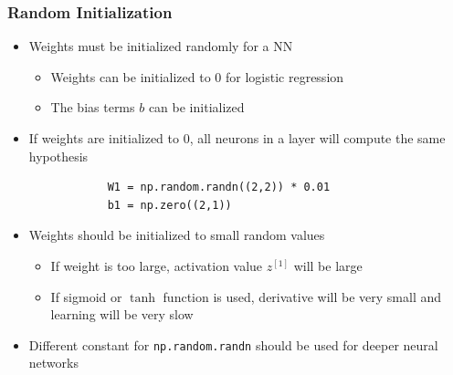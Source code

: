 \documentclass[12pt, letterpaper]{article}
\begin{document}
    \subsubsection{Random Initialization}
    \begin{itemize}
        \item Weights must be initialized randomly for a NN
        \begin{itemize}
            \item Weights can be initialized to 0 for logistic regression
            \item The bias terms $b$ can be initialized
        \end{itemize}
        \item If weights are initialized to 0, all neurons in a layer will compute the same hypothesis
        \begin{verbatim}
            W1 = np.random.randn((2,2)) * 0.01
            b1 = np.zero((2,1))  
        \end{verbatim}
        \item Weights should be initialized to small random values
        \begin{itemize}
            \item If weight is too large, activation value $z^{[1]}$ will be large
            \item If sigmoid or $\tanh$ function is used, derivative will be very small and learning will be very slow
        \end{itemize}
        \item Different constant for \texttt{np.random.randn} should be used for deeper neural networks
    \end{itemize}
\end{document}
